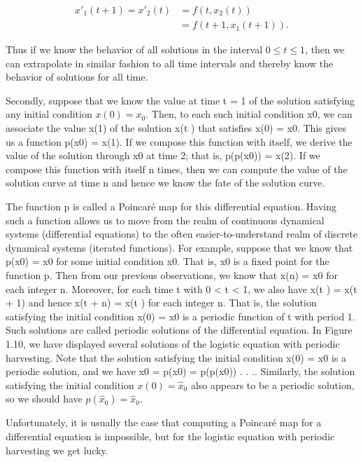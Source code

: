 \documentclass[12pt]{article}
\begin{document}
\[
\begin{aligned} 
x'_1(t + 1) = x'_2(t) &= f(t, x_2(t)) \\ 
&= f (t + 1, x_1(t + 1)).
\end{aligned}
\]

Thus if we know the behavior of all solutions in the interval $0 \leq t  \leq 1$, then
we can extrapolate in similar fashion to all time intervals and thereby know
the behavior of solutions for all time.

Secondly, suppose that we know the value at time t = 1 of the solution
satisfying any initial condition $x(0) = x_0$. Then, to each such initial condition
x0, we can associate the value x(1) of the solution x(t ) that satisfies x(0) = x0.
This gives us a function p(x0) = x(1). If we compose this function with itself,
we derive the value of the solution through x0 at time 2; that is, p(p(x0)) =
x(2). If we compose this function with itself n times, then we can compute
the value of the solution curve at time n and hence we know the fate of the
solution curve.

The function p is called a Poincaré map for this differential equation. Having
such a function allows us to move from the realm of continuous dynamical
systems (differential equations) to the often easier-to-understand realm of
discrete dynamical systems (iterated functions). For example, suppose that
we know that p(x0) = x0 for some initial condition x0. That is, x0 is a fixed
point for the function p. Then from our previous observations, we know that
x(n) = x0 for each integer n. Moreover, for each time t with 0 < t < 1, we
also have x(t ) = x(t + 1) and hence x(t + n) = x(t ) for each integer n.
That is, the solution satisfying the initial condition x(0) = x0 is a periodic
function of t with period 1. Such solutions are called periodic solutions of the
differential equation. In Figure 1.10, we have displayed several solutions of the
logistic equation with periodic harvesting. Note that the solution satisfying
the initial condition x(0) = x0 is a periodic solution, and we have x0 =
p(x0) = p(p(x0)) . . .. Similarly, the solution satisfying the initial condition
$x(0) = \hat{x}_0$ also appears to be a periodic solution, so we should have $p(\hat{x}_0) = \hat{x}_0$.

Unfortunately, it is usually the case that computing a Poincaré map for a
differential equation is impossible, but for the logistic equation with periodic
harvesting we get lucky.

\hfill
\end{document}
